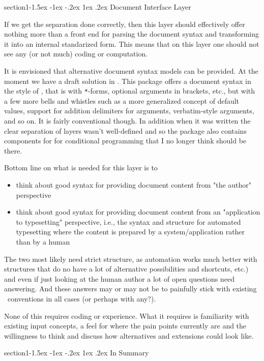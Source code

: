 \documentclass{ltnews}
\makeatletter
\newcommand{\@subheadingfont}{%
   \sffamily\slshape
   \let\LaTeX\cmssLaTeX\let\TeX\cmssTeX
}
\renewcommand{\subsection}{%
   \@startsection
      {section}{1}{\z@}{-1.5ex \@plus -1ex \@minus -.2ex}%
      {1ex \@plus.2ex}{\@subheadingfont}%
}
\makeatother
\begin{document}
\subsection{Document Interface Layer}

If we get the separation done correctly, then this layer should effectively offer nothing more than a front end for parsing the document syntax and transforming it into an internal standarized form. This means that on this layer one should not see any (or not much) coding or computation.

It is envisioned that alternative document syntax models can be provided.
At the moment we have a draft solution in .
This package offers a document syntax in the style of \LaTeXe, that is with \verb|*|-forms, optional arguments in brackets, etc., but with a few more bells and whistles such as a more generalized concept of default values, support for addition delimiters for arguments, verbatim-style arguments, and so on.
It is fairly conventional though.
In addition when it was written the clear separation of layers wasn't well-defined and so the package also contains components for for conditional programming that I no longer think should be there.

Bottom line on what is needed for this layer is to
\begin{itemize}
\item think about good syntax for providing document content from "the author" perspective
\item think about good syntax for providing document content from an "application to typesetting" perspective, i.e., the syntax and structure for automated typesetting where the content is prepared by a system/application rather than by a human
\end{itemize}
The two most likely need strict structure, as automation works much better with structures that do no have a lot of alternative possibilities and shortcuts, etc.) and even if just looking at the human author a lot of open questions need answering.
And these answers may or may not be to painfully stick with existing \LaTeXe\ conventions in all cases (or perhaps with any?).

None of this requires coding or  experience. What it requires is familiarity with existing input concepts, a feel for where the pain points currently are and the willingness to think and discuss how alternatives and extensions could look like.

\subsection{In Summary}
\end{document}
